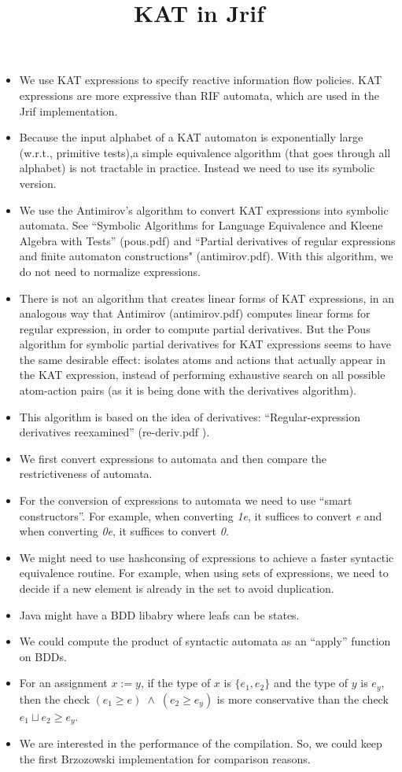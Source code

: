 \documentclass[10pt]{article}
\title{KAT in Jrif}
\begin{document}
\maketitle
\begin{itemize}
\item We use KAT expressions to specify reactive information flow policies. KAT expressions are more expressive than RIF automata, which are used in the Jrif implementation.
\item Because the input alphabet of a KAT automaton is exponentially large (w.r.t., primitive tests),a simple equivalence algorithm (that goes through all alphabet) is not tractable in practice. Instead we need to use its symbolic version.
\item We use the Antimirov's algorithm to convert KAT expressions into symbolic automata. See ``Symbolic Algorithms for Language Equivalence and Kleene Algebra with Tests'' (pous.pdf) and ``Partial derivatives of regular expressions and finite automaton constructions" (antimirov.pdf). With this algorithm, we do not need to normalize expressions.
\item There is not an algorithm that creates linear forms of KAT expressions, in an analogous way that Antimirov (antimirov.pdf) computes linear forms for regular expression, in order to compute partial derivatives. But the Pous algorithm for symbolic partial derivatives for KAT expressions seems to have the same desirable effect: isolates atoms and actions that actually appear in the KAT expression, instead of performing exhaustive search on all possible atom-action pairs (as it is being done with the derivatives algorithm).
\item This algorithm is based on the idea of derivatives: ``Regular-expression derivatives reexamined'' (re-deriv.pdf
).
\item We first convert expressions to automata and then compare the restrictiveness of automata.
\item For the conversion of expressions to automata we need to use ``smart constructors''. For example, when converting \emph{1e}, it suffices to convert \emph{e} and when converting \emph{0e}, it suffices to convert \emph{0}.
\item We might need to use hashconsing of expressions to achieve a faster syntactic equivalence routine. For example, when using sets of expressions, we need to decide if a new element is already in the set to avoid duplication.
\item Java might have a BDD libabry where leafs can be states.
\item We could compute the product of syntactic automata as an ``apply'' function on BDDs.
\item For an assignment $x:=y$, if the type of $x$ is $\{e_1,e_2\}$ and the type of $y$ is $e_y$, then the check $(e_1\geq e)\;\wedge\;(e_2\geq e_y)$ is more conservative than the check $e_1\sqcup e_2\geq e_y$.
\item We are interested in the performance of the compilation. So, we could keep the first Brzozowski implementation for comparison reasons.
\end{itemize}
\end{document}
